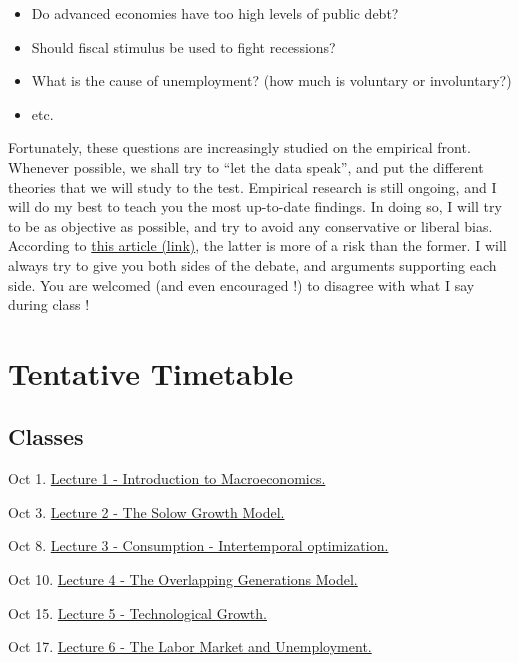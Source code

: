 \documentclass[]{book}
\providecommand{\tightlist}{%
  \setlength{\itemsep}{0pt}\setlength{\parskip}{0pt}}
\theoremstyle{definition}
\theoremstyle{definition}
\theoremstyle{definition}
\theoremstyle{remark}
\begin{document}
\begin{itemize}
\tightlist
\item
  Do advanced economies have too high levels of public debt?
\item
  Should fiscal stimulus be used to fight recessions?
\item
  What is the cause of unemployment? (how much is voluntary or
  involuntary?)
\item
  etc.
\end{itemize}

Fortunately, these questions are increasingly studied on the empirical
front. Whenever possible, we shall try to ``let the data speak'', and
put the different theories that we will study to the test. Empirical
research is still ongoing, and I will do my best to teach you the most
up-to-date findings. In doing so, I will try to be as objective as
possible, and try to avoid any conservative or liberal bias. According
to
\href{https://www.bloomberg.com/view/articles/2018-09-17/colleges-have-way-too-many-liberal-professors}{this
article (link)}, the latter is more of a risk than the former. I will
always try to give you both sides of the debate, and arguments
supporting each side. You are welcomed (and even encouraged !) to
disagree with what I say during class !

\chapter*{Tentative Timetable}\label{tentative-timetable}

\section*{Classes}\label{classes}

Oct 1. \href{lecture1.html}{Lecture 1 - Introduction to Macroeconomics.}

Oct 3. \href{lecture2.html}{Lecture 2 - The Solow Growth Model.}

Oct 8. \href{lecture3.html}{Lecture 3 - Consumption - Intertemporal
optimization.}

Oct 10. \href{lecture4.html}{Lecture 4 - The Overlapping Generations
Model.}

Oct 15. \href{lecture5.html}{Lecture 5 - Technological Growth.}

Oct 17. \href{lecture6.html}{Lecture 6 - The Labor Market and
Unemployment.}
\end{document}
